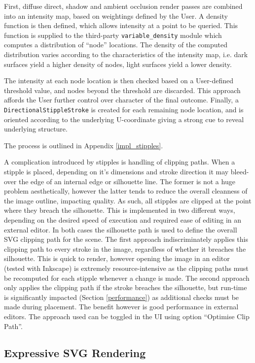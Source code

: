 {First, diffuse direct, shadow and ambient occlusion render passes are combined into an intensity map, based on weightings defined by the User.
A density function is then defined, which allows intensity at a point to be queried.
This function is supplied to the third-party \texttt{variable\_density} module which computes a distribution of ``node'' locations.
The density of the computed distribution varies according to the characteristics of the intensity map, i.e. dark surfaces yield a higher density of nodes, light surfaces yield a lower density.

The intensity at each node location is then checked based on a User-defined threshold value, and nodes beyond the threshold are discarded.
This approach affords the User further control over character of the final outcome.
Finally, a \texttt{DirectionalStippleStroke} is created for each remaining node location, and is oriented according to the underlying U-coordinate giving a strong cue to reveal underlying structure.

The process is outlined in Appendix \ref{impl_stipples}.

A complication introduced by stipples is handling of clipping paths.
When a stipple is placed, depending on it's dimensions and stroke direction it may bleed-over the edge of an internal edge or silhouette line.
The former is not a huge problem aesthetically, however the latter tends to reduce the overall cleanness of the image outline, impacting quality.
As such, all stipples are clipped at the point where they breach the silhouette.
This is implemented in two different ways, depending on the desired speed of execution and required ease of editing in an external editor.
In both cases the silhouette path is used to define the overall SVG clipping path for the scene.
The first approach indiscriminately applies this clipping path to every stroke in the image, regardless of whether it breaches the silhouette.
This is quick to render, however opening the image in an editor (tested with Inkscape) is extremely resource-intensive as the clipping paths must be recomputed for each stipple whenever a change is made.
The second approach only applies the clipping path if the stroke breaches the silhouette, but run-time is significantly impacted (Section \ref{performance}) as additional checks must be made during placement.
The benefit however is good performance in external editors.
The approach used can be toggled in the UI using option ``Optimise Clip Path''.

\subsection{Expressive SVG Rendering}

}
